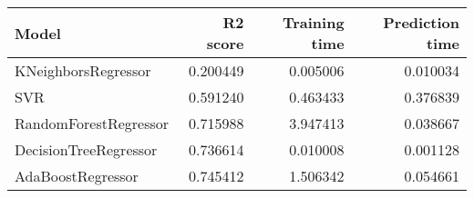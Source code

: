 \begin{tabular}{lrrr}
\toprule
Model & R2 score & Training time & Prediction time \\
\midrule
KNeighborsRegressor & 0.200449 & 0.005006 & 0.010034 \\
SVR & 0.591240 & 0.463433 & 0.376839 \\
RandomForestRegressor & 0.715988 & 3.947413 & 0.038667 \\
DecisionTreeRegressor & 0.736614 & 0.010008 & 0.001128 \\
AdaBoostRegressor & 0.745412 & 1.506342 & 0.054661 \\
\bottomrule
\end{tabular}
